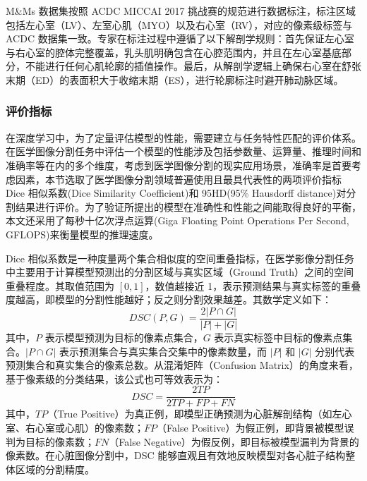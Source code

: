 \documentclass[12pt, a4paper, twoside]{article}
\begin{document}
M\&Ms 数据集按照 ACDC MICCAI 2017 挑战赛的规范进行数据标注，标注区域包括左心室（LV）、左室心肌（MYO）以及右心室（RV），对应的像素级标签与 ACDC 数据集一致。专家在标注过程中遵循了以下解剖学规则：首先保证左心室与右心室的腔体完整覆盖，乳头肌明确包含在心腔范围内，并且在左心室基底部分，不能进行任何心肌轮廓的插值操作。最后，从解剖学逻辑上确保右心室在舒张末期（ED）的表面积大于收缩末期（ES），进行轮廓标注时避开肺动脉区域。


\subsubsection{评价指标}

在深度学习中，为了定量评估模型的性能，需要建立与任务特性匹配的评价体系。在医学图像分割任务中评估一个模型的性能涉及包括参数量、运算量、推理时间和准确率等在内的多个维度，考虑到医学图像分割的现实应用场景，准确率是首要考虑因素，本节选取了医学图像分割领域普遍使用且最具代表性的两项评价指标 Dice 相似系数(Dice Similarity Coefficient)和 95HD(95\% Hausdorff distance)对分割结果进行评价。为了验证所提出的模型在准确性和性能之间能取得良好的平衡，本文还采用了每秒十亿次浮点运算(Giga Floating Point Operations Per Second, GFLOPS)来衡量模型的推理速度。

Dice 相似系数是一种度量两个集合相似度的空间重叠指标，在医学影像分割任务中主要用于计算模型预测出的分割区域与真实区域（Ground Truth）之间的空间重叠程度。其取值范围为 $[0, 1]$，数值越接近 1，表示预测结果与真实标签的重叠度越高，即模型的分割性能越好；反之则分割效果越差。其数学定义如下：
\begin{equation}
DSC(P, G) = \frac{2|P \cap G|}{|P| + |G|}
\end{equation}
其中，$P$ 表示模型预测为目标的像素点集合，$G$ 表示真实标签中目标的像素点集合。$|P \cap G|$ 表示预测集合与真实集合交集中的像素数量，而 $|P|$ 和 $|G|$ 分别代表预测集合和真实集合的像素总数。从混淆矩阵（Confusion Matrix）的角度来看，基于像素级的分类结果，该公式也可等效表示为：
\begin{equation}
DSC = \frac{2TP}{2TP + FP + FN}
\end{equation}
其中，$TP$（True Positive）为真正例，即模型正确预测为心脏解剖结构（如左心室、右心室或心肌）的像素数；$FP$（False Positive）为假正例，即背景被模型误判为目标的像素数；$FN$（False Negative）为假反例，即目标被模型漏判为背景的像素数。在心脏图像分割中，DSC 能够直观且有效地反映模型对各心脏子结构整体区域的分割精度。
\end{document}
